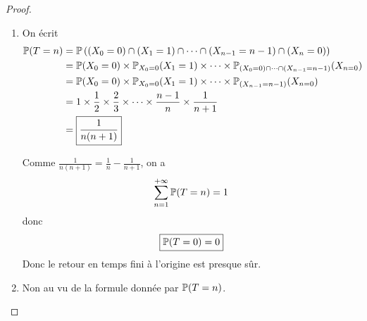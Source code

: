 \begin{proof}
\begin{enumerate}
        \item On écrit 
        \begin{align}
            \P(T=n)
            &=\P\left(\left(X_{0}=0\right)\cap\left(X_{1}=1\right)\cap\dots\cap\left(X_{n-1}=n-1\right)\cap\left(X_{n}=0\right)\right)\\
            &=\P(X_{0}=0)\times\P_{X_{0}=0}(X_{1}=1)\times\dots\times\P_{\left(X_{0}=0\right)\cap\dots\cap\left(X_{n-1}=n-1\right)}(X_{n=0})\\
            &=\P(X_{0}=0)\times\P_{X_{0}=0}(X_{1}=1)\times\dots\times\P_{\left(X_{n-1}=n-1\right)}(X_{n=0})\\
            &=1\times\frac{1}{2}\times\frac{2}{3}\times\dots\times\frac{n-1}{n}\times\frac{1}{n+1}\\
            &=\boxed{\frac{1}{n(n+1)}}
        \end{align}

        Comme $\frac{1}{n(n+1)}=\frac{1}{n}-\frac{1}{n+1}$, on a 
        \begin{equation}
            \sum_{n=1}^{+\infty}\P(T=n)=1
        \end{equation}
        donc 
        \begin{equation}
            \boxed{\P(T=0)=0}
        \end{equation}
        Donc le retour en temps fini à l'origine est presque sûr.

        \item Non au vu de la formule donnée par $\P(T=n)$.
    \end{enumerate}
\end{proof}

